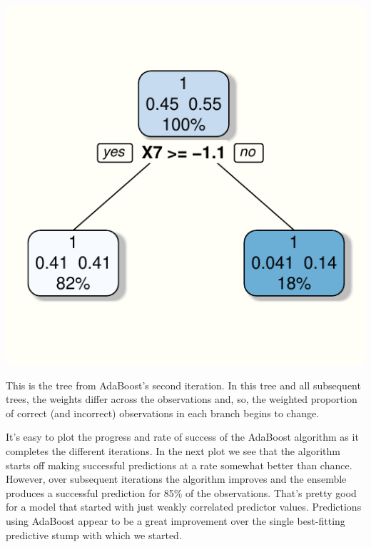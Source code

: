 \documentclass[]{tufte-handout}
\begin{document}
\begin{marginfigure}
\includegraphics{2018-02-19-data-science-unplugged-additive-boosting_files/figure-latex/second.iteration-1} \caption[This is the tree from AdaBoost's second iteration]{This is the tree from AdaBoost's second iteration. In this tree and all subsequent trees, the weights differ across the observations and, so, the weighted proportion of correct (and incorrect) observations in each branch begins to change.}\label{fig:second.iteration}
\end{marginfigure}

It's easy to plot the progress and rate of success of the AdaBoost
algorithm as it completes the different iterations. In the next plot we
see that the algorithm starts off making successful predictions at a
rate somewhat better than chance. However, over subsequent iterations
the algorithm improves and the ensemble produces a successful prediction
for 85\% of the observations. That's pretty good for a model that
started with just weakly correlated predictor values. Predictions using
AdaBoost appear to be a great improvement over the single best-fitting
predictive stump with which we started.
\end{document}
